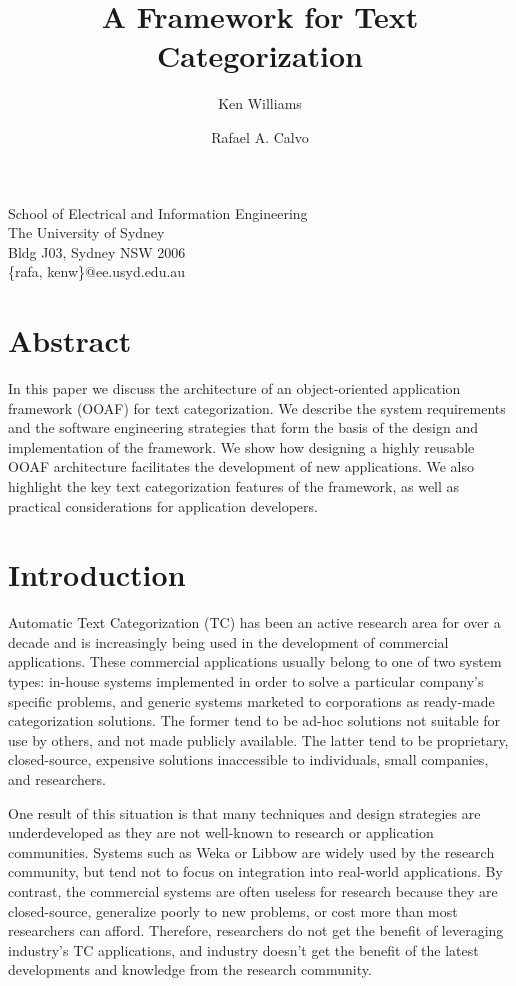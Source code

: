 \documentclass[a4paper,twocolumn]{article}
\title{A Framework for Text Categorization}
\author{Ken Williams \and Rafael A. Calvo}
\begin{document}
\maketitle

\begin{center}
School of Electrical and Information Engineering\\
The University of Sydney\\
Bldg J03, Sydney NSW 2006\\
\{rafa, kenw\}@ee.usyd.edu.au
\end{center}

\section*{Abstract}

In this paper we discuss the architecture of an object-oriented
application framework (OOAF) for text categorization. We describe the
system requirements and the software engineering strategies that
form the basis of the design and implementation of the framework.  We show how
designing a highly reusable OOAF architecture facilitates the
development of new applications.  We also highlight the key text
categorization features of the framework, as well as practical
considerations for application developers.


\section{Introduction}

Automatic Text Categorization (TC) has been an active research area
for over a decade and is increasingly being used in the development of
commercial applications.  These commercial applications usually belong to
one of two system types: in-house systems implemented in order to
solve a particular company's specific problems, and generic systems marketed to
corporations as ready-made categorization solutions.  The former tend
to be ad-hoc solutions not suitable for use by others, and not made
publicly available.  The
latter tend to be proprietary, closed-source, expensive solutions
inaccessible to individuals, small companies, and researchers.

One result of this situation is that many techniques and
design strategies are underdeveloped as they are not well-known to research or
application communities.  Systems such as Weka \cite{weka:99} or
Libbow \cite{bow:96} are widely used by the research community, but
tend not to focus on integration into real-world applications.  By
contrast, the commercial systems are often useless for research
because they are closed-source, generalize poorly to new problems, or
cost more than most researchers can afford.  Therefore, researchers do
not get the benefit of leveraging industry's TC
applications, and industry doesn't get the benefit of the latest
developments and knowledge from the research community.
\end{document}

